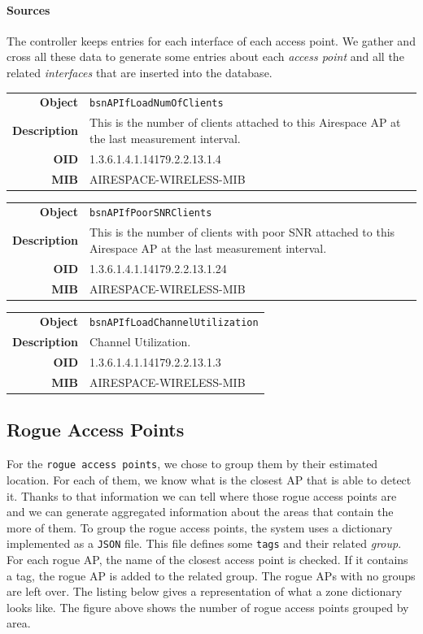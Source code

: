 \paragraph*{Sources} The controller keeps entries for each interface of each access point. We gather and cross all these data to generate some entries about each \emph{access point} and all the related \emph{interfaces} that are inserted into the database.

\begin{tabular}{|r l|}
\hline
\textbf{Object} & \texttt{bsnAPIfLoadNumOfClients} \\
\textbf{Description} & \parbox{11cm}{This is the number of clients attached to this Airespace AP at the last measurement interval.} \\
\textbf{OID} & 1.3.6.1.4.1.14179.2.2.13.1.4 \\
\textbf{MIB} & AIRESPACE-WIRELESS-MIB \\
\hline
\end{tabular}

\begin{tabular}{|r l|}
\hline
\textbf{Object} & \texttt{bsnAPIfPoorSNRClients} \\
\textbf{Description} & \parbox{11cm}{This is the number of clients with poor SNR attached to this Airespace AP at the last measurement interval.} \\
\textbf{OID} & 1.3.6.1.4.1.14179.2.2.13.1.24 \\
\textbf{MIB} & AIRESPACE-WIRELESS-MIB \\
\hline
\end{tabular}

\begin{tabular}{|r l|}
\hline
\textbf{Object} & \texttt{bsnAPIfLoadChannelUtilization} \\
\textbf{Description} & \parbox{11cm}{Channel Utilization.} \\
\textbf{OID} & 1.3.6.1.4.1.14179.2.2.13.1.3 \\
\textbf{MIB} & AIRESPACE-WIRELESS-MIB \\
\hline
\end{tabular}

\subsection{Rogue Access Points}
For the \texttt{rogue access points}, we chose to group them by their estimated location. For each of them, we know what is the closest AP that is able to detect it. Thanks to that information we can tell where those rogue access points are and we can generate aggregated information about the areas that contain the more of them. To group the rogue access points, the system uses a dictionary implemented as a \texttt{JSON} file. This file defines some \texttt{tags} and their related \emph{group}. For each rogue AP, the name of the closest access point is checked. If it contains a tag, the rogue AP is added to the related group. The rogue APs with no groups are left over. The listing below gives a representation of what a zone dictionary looks like. The figure above shows the number of rogue access points grouped by area.

